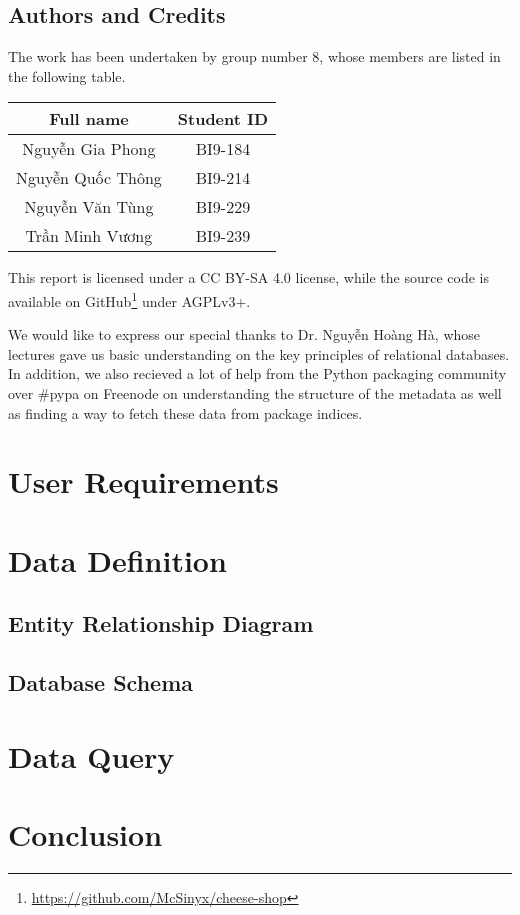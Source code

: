 \documentclass[a4paper,12pt]{article}
\begin{document}
\subsection{Authors and Credits}
The work has been undertaken by group number 8, whose members are listed
in the following table.
\begin{center}
  \begin{tabular}{c c}
    \toprule
    Full name & Student ID\\
    \midrule
    Nguyễn Gia Phong & BI9-184\\
    Nguyễn Quốc Thông & BI9-214\\
    Nguyễn Văn Tùng & BI9-229\\
    Trần Minh Vương & BI9-239\\
    \bottomrule
  \end{tabular}
\end{center}

This report is licensed under a CC BY-SA 4.0 license, while the source code is
available on GitHub\footnote{\url{https://github.com/McSinyx/cheese-shop}}
under AGPLv3+.

We would like to express our special thanks to Dr. Nguyễn Hoàng Hà,
whose lectures gave us basic understanding on the key principles of
relational databases.  In addition, we also recieved a lot of help from
the Python packaging community over \#pypa on Freenode on understanding
the structure of the metadata as well as finding a way to fetch these
data from package indices.

\newpage
{}
\section{User Requirements}

\section{Data Definition}
\subsection{Entity Relationship Diagram}
\subsection{Database Schema}

\section{Data Query}

\section{Conclusion}

\begin{thebibliography}{69}
\end{thebibliography}
\end{document}
